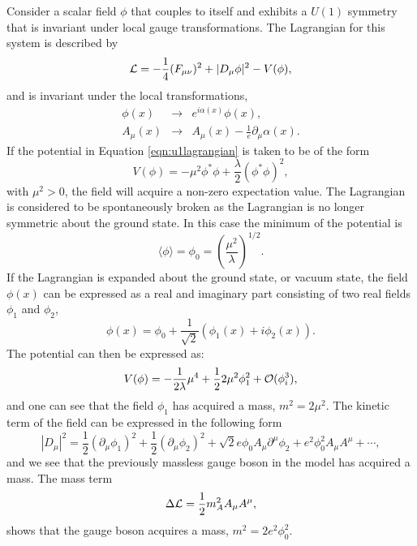 Consider a scalar field $\phi$ that couples to itself and exhibits a  $U(1)$ symmetry that is invariant under local gauge transformations.
The Lagrangian for this system is described by
\begin{equation}
\label{eqn:u1lagrangian}
\mathcal{L} = -\frac{1}{4}(F_{\mu\nu})^{2} + |D_{\mu}\phi|^{2} - V(\phi),
\end{equation}
and is invariant under the local transformations, 
\begin{equation}
\begin{array}{rcl}
\phi(x)    & \rightarrow & e^{i\alpha(x)}\phi(x), \\
A_{\mu}(x) & \rightarrow & A_{\mu}(x) - \frac{1}{e}\partial_{\mu}\alpha(x).
\end{array}
\end{equation}
If the potential in Equation \ref{eqn:u1lagrangian} is taken to be of the form 
\begin{equation}
V(\phi) = -\mu^{2}\phi^{*}\phi + \frac{\lambda}{2}(\phi^{*}\phi)^{2},
\end{equation}
with $\mu^{2} > 0$, the field will acquire a non-zero expectation value.
The Lagrangian is considered to be spontaneously broken as the Lagrangian is no longer symmetric about the ground state.
In this case the minimum of the potential is
\begin{equation}
\langle\phi\rangle = \phi_{0} = \left(\frac{\mu^{2}}{\lambda}\right)^{1/2}.
\end{equation}
If the Lagrangian is expanded about the ground state, or vacuum state, the field $\phi(x)$ can be expressed as a real and imaginary part consisting of two real fields $\phi_{1}$ and $\phi_{2}$,
\begin{equation}
\phi(x) = \phi_{0} + \frac{1}{\sqrt{2}}\left(\phi_{1}(x) + i\phi_{2}(x)\right).
\end{equation}
The potential can then be expressed as:
\begin{equation}
V(\phi) = -\frac{1}{2\lambda}\mu^{4} + \frac{1}{2} 2\mu^{2}\phi_{1}^{2} + \mathcal{O}(\phi_{i}^{3}),
\end{equation}
and one can see that the field $\phi_{1}$ has acquired a mass, $m^{2} = 2\mu^{2}$.
The kinetic term of the field can be expressed in the following form
\begin{equation}
|D_{\mu}|^{2} = \frac{1}{2}(\partial_{\mu}\phi_{1})^{2} + \frac{1}{2}(\partial_{\mu}\phi_{2})^{2} + \sqrt{2}e\phi_{0}A_{\mu}\partial^{\mu}\phi_{2} + e^{2}\phi_{0}^{2}A_{\mu}A^{\mu} + \cdots,
\end{equation}
and we see that the previously massless gauge boson in the model has acquired a mass.
The mass term 
\begin{equation}
\Delta\mathcal{L} = \frac{1}{2}m_{A}^{2}A_{\mu}A^{\mu},
\end{equation}
shows that the gauge boson acquires a mass, $m^{2} = 2e^{2}\phi_{0}^{2}$.

